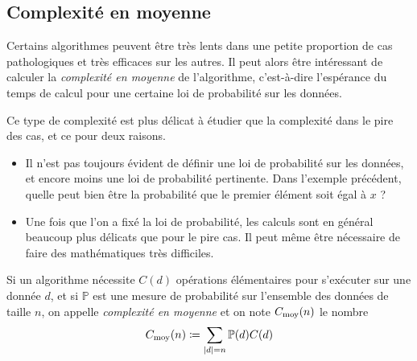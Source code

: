 \documentclass{magnolia}
\begin{document}
\subsection{Complexité en moyenne}

Certains algorithmes peuvent être très lents dans une petite
proportion de cas \og pathologiques \fg et très efficaces sur les autres.
Il peut alors être intéressant de calculer la \emph{complexité en moyenne}
de l'algorithme, c'est-à-dire l'espérance du temps de calcul
pour une certaine loi de probabilité sur les données. \smallskip

Ce type de complexité est plus délicat à étudier que la complexité
dans le pire des cas, et ce pour deux raisons.
\begin{itemize}
  \item Il n'est pas toujours évident de définir une loi de
  probabilité sur les données, et encore moins une loi de
  probabilité pertinente. Dans l'exemple précédent, quelle
  peut bien être la probabilité que le premier élément soit
  égal à $x$ ?
  \item Une fois que l'on a fixé la loi de probabilité, les
  calculs sont en général beaucoup plus délicats que pour le pire cas.
  Il peut même être nécessaire de faire des mathématiques très difficiles.
\end{itemize}

\begin{definition}
Si un algorithme nécessite $C(d)$ opérations élémentaires pour s'exécuter
sur une donnée $d$, et si $\mathbb{P}$ est une mesure de probabilité
sur l'ensemble des données de taille $n$, on appelle \emph{complexité en moyenne} et on note $C_{\rm moy}(n)$
le nombre
\[C_{\rm moy}(n)\coloneqq \sum_{\left|d\right|=n} \mathbb{P}(d) C(d)\]
\end{definition}
\end{document}
